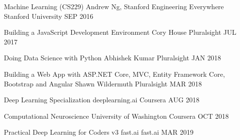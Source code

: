 

\begin{cvhonors}

  \cvhonor
    {Machine Learning (CS229)} %
    {Andrew Ng, Stanford Engineering Everywhere} %
    {Stanford University} %
    {SEP 2016} %

  \cvhonor
    {Building a JavaScript Development Environment} %
    {Cory House} %
    {Pluralsight} %
    {JUL 2017} %

  \cvhonor
    {Doing Data Science with Python} %
    {Abhishek Kumar} %
    {Pluralsight} %
    {JAN 2018} %

  \cvhonor
    {Building a Web App with ASP.NET Core, MVC, Entity Framework Core, Bootstrap and Angular} %
    {Shawn Wildermuth} %
    {Pluralsight} %
    {MAR 2018} %

  \cvhonor
    {Deep Learning Specialization} %
    {deeplearning.ai} %
    {Coursera} %
    {AUG 2018} %

  \cvhonor
    {Computational Neuroscience} %
    {University of Washington} %
    {Coursera} %
    {OCT 2018} %

  \cvhonor
    {Practical Deep Learning for Coders v3} %
    {fast.ai} %
    {fast.ai} %
    {MAR 2019} %

\end{cvhonors}
